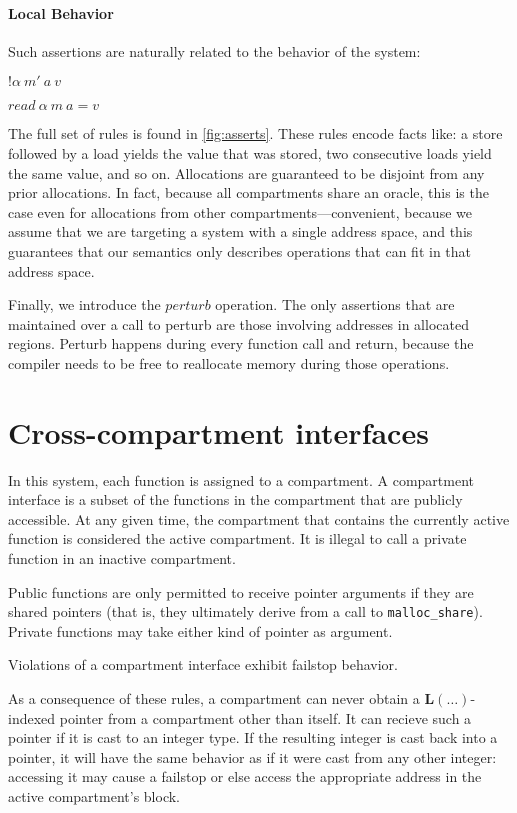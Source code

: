 \documentclass{article}
\begin{document}
\paragraph{Local Behavior}

Such assertions are naturally related to the behavior of the system:

\begin{minipage}[t]{0.25\textwidth}
           {\(! \alpha ~ m' ~ a ~ v\)}
\end{minipage}
\begin{minipage}[t]{0.25\textwidth}
           {\(\mathit{read} ~ \alpha ~ m ~ a = v\)}
\end{minipage}

The full set of rules is found in \ref{fig:asserts}. These rules encode facts like:
a store followed by a load yields the value that was stored, two consecutive loads yield
the same value, and so on. Allocations are guaranteed to be disjoint from any prior allocations.
In fact, because all compartments share an oracle, this is the case even for allocations from
other compartments---convenient, because we assume that we are targeting a system with a single
address space, and this guarantees that our semantics only describes operations that can fit in
that address space.

Finally, we introduce the \(\mathit{perturb}\) operation. The only assertions that are maintained
over a call to perturb are those involving addresses in allocated regions. Perturb happens during
every function call and return, because the compiler needs to be free to reallocate memory
during those operations.

\section{Cross-compartment interfaces}

In this system, each function is assigned to a compartment. A compartment interface is a subset
of the functions in the compartment that are publicly accessible. At any given time, the compartment
that contains the currently active function is considered the active compartment. It is illegal
to call a private function in an inactive compartment.

Public functions are only permitted to receive pointer arguments if they are shared pointers
(that is, they ultimately derive from a call to {\tt malloc\_share}). Private functions may take
either kind of pointer as argument.

Violations of a compartment interface exhibit failstop behavior.

As a consequence of these rules, a compartment can never obtain a \(\mathbf{L}(\dots)\)-indexed pointer
from a compartment other than itself. It can recieve such a pointer if it is cast to an integer type. If
the resulting integer is cast back into a pointer, it will have the same behavior as if it were cast
from any other integer: accessing it may cause a failstop or else access the appropriate address in
the active compartment's block.
\end{document}
